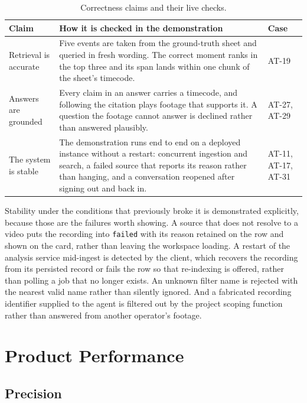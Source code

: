 \documentclass[11pt,a4paper]{article}
\begin{document}
\begin{table}[htbp]
\centering
\small
\begin{tabularx}{\textwidth}{@{}L{3.0cm}XL{2.0cm}@{}}
\toprule
\textbf{Claim} & \textbf{How it is checked in the demonstration} & \textbf{Case} \\
\midrule
Retrieval is accurate & Five events are taken from the ground-truth sheet and queried in fresh wording. The correct moment ranks in the top three and its span lands within one chunk of the sheet's timecode. & AT-19 \\
Answers are grounded & Every claim in an answer carries a timecode, and following the citation plays footage that supports it. A question the footage cannot answer is declined rather than answered plausibly. & AT-27, AT-29 \\
The system is stable & The demonstration runs end to end on a deployed instance without a restart: concurrent ingestion and search, a failed source that reports its reason rather than hanging, and a conversation reopened after signing out and back in. & AT-11, AT-17, AT-31 \\
\bottomrule
\end{tabularx}
\caption{Correctness claims and their live checks.}
\end{table}

Stability under the conditions that previously broke it is demonstrated
explicitly, because those are the failures worth showing. A source that does not
resolve to a video puts the recording into \texttt{failed} with its reason
retained on the row and shown on the card, rather than leaving the workspace
loading. A restart of the analysis service mid-ingest is detected by the client,
which recovers the recording from its persisted record or fails the row so that
re-indexing is offered, rather than polling a job that no longer exists. An
unknown filter name is rejected with the nearest valid name rather than silently
ignored. And a fabricated recording identifier supplied to the agent is filtered
out by the project scoping function rather than answered from another operator's
footage.

\section{Product Performance}

\subsection{Precision}
\end{document}
